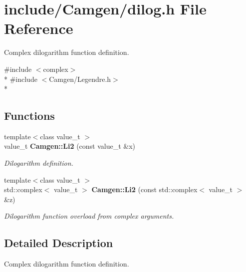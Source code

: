 \hypertarget{a00610}{\section{include/\-Camgen/dilog.h File Reference}
\label{a00610}
}


Complex dilogarithm function definition.  


{\ttfamily \#include $<$complex$>$}\\*
{\ttfamily \#include $<$Camgen/\-Legendre.\-h$>$}\\*
\subsection*{Functions}
\begin{DoxyCompactItemize}
\item 
\hypertarget{a00849_a656698c2e540b0dc3a5969cbc8f07fed}{{\footnotesize template$<$class value\-\_\-t $>$ }\\value\-\_\-t {\bfseries Camgen\-::\-Li2} (const value\-\_\-t \&x)}\label{a00849_a656698c2e540b0dc3a5969cbc8f07fed}

\begin{DoxyCompactList}\small\item\em Dilogarithm definition. \end{DoxyCompactList}\item 
\hypertarget{a00849_ac189f41d161f9b297550679cb2f79e5d}{{\footnotesize template$<$class value\-\_\-t $>$ }\\std\-::complex$<$ value\-\_\-t $>$ {\bfseries Camgen\-::\-Li2} (const std\-::complex$<$ value\-\_\-t $>$ \&z)}\label{a00849_ac189f41d161f9b297550679cb2f79e5d}

\begin{DoxyCompactList}\small\item\em Dilogarithm function overload from complex arguments. \end{DoxyCompactList}\end{DoxyCompactItemize}


\subsection{Detailed Description}
Complex dilogarithm function definition. 